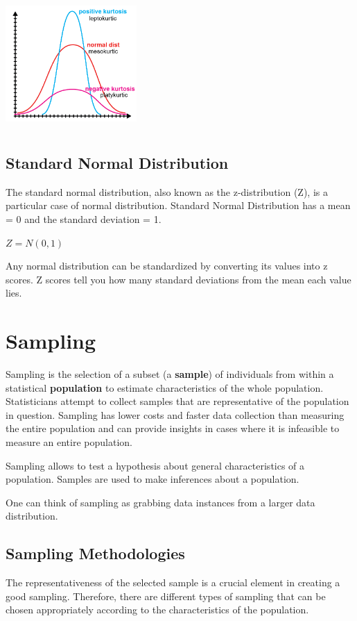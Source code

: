 \documentclass{article}
\begin{document}
\includegraphics[width=5cm, height=5cm]{kurtosis}

\subsection{Standard Normal Distribution}
The standard normal distribution, also known as the z-distribution (Z), is a particular case of normal distribution. Standard Normal Distribution has a mean = 0 and the standard deviation = 1.

$Z = N(0,1)$

Any normal distribution can be standardized by converting its values into z scores. Z scores tell you how many standard deviations from the mean each value lies.

\clearpage

\section{Sampling}
Sampling is the selection of a subset (a \textbf{sample}) of individuals from within a statistical \textbf{population} to estimate characteristics of the whole population. Statisticians attempt to collect samples that are representative of the population in question. Sampling has lower costs and faster data collection than measuring the entire population and can provide insights in cases where it is infeasible to measure an entire population.

Sampling allows to test a hypothesis about general characteristics of a population.
Samples are used to make inferences about a population. 

One can think of sampling as grabbing data instances from a larger data distribution. 

\subsection{Sampling Methodologies}
The representativeness of the selected sample is a crucial element in creating a good sampling. Therefore, there are different types of sampling that can be chosen appropriately according to the characteristics of the population.
\end{document}
